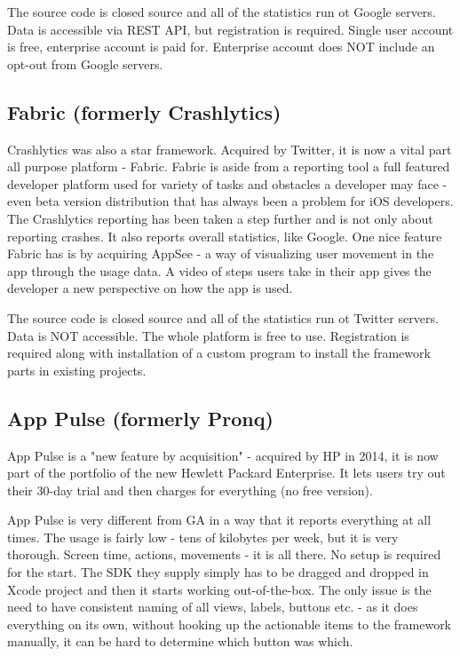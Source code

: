 The source code is closed source and all of the statistics run ot Google servers. Data is accessible via REST API, but registration is required. Single user account is free, enterprise account is paid for. Enterprise account does NOT include an opt-out from Google servers.


\subsection{Fabric (formerly Crashlytics)}

Crashlytics was also a star framework. Acquired by Twitter, it is now a vital part all purpose platform - Fabric. Fabric is aside from a reporting tool a full featured developer platform used for variety of tasks and obstacles a developer may face - even beta version distribution that has always been a problem for iOS developers. The Crashlytics reporting has been taken a step further and is not only about reporting crashes. It also reports overall statistics, like Google. One nice feature Fabric has is by acquiring AppSee - a way of visualizing user movement in the app through the usage data. A video of steps users take in their app gives the developer a new perspective on how the app is used.

The source code is closed source and all of the statistics run ot Twitter servers. Data is NOT accessible. The whole platform is free to use. Registration is required along with installation of a custom program to install the framework parts in existing projects.


\subsection{App Pulse (formerly Pronq)}

App Pulse is a "new feature by acquisition" - acquired by HP in 2014, it is now part of the portfolio of the new Hewlett Packard Enterprise. It lets users try out their 30-day trial and then charges for everything (no free version).

App Pulse is very different from GA in a way that it reports everything at all times. The usage is fairly low - tens of kilobytes per week, but it is very thorough. Screen time, actions, movements - it is all there. No setup is required for the start. The SDK they supply simply has to be dragged and dropped in Xcode project and then it starts working out-of-the-box. The only issue is the need to have consistent naming of all views, labels, buttons etc. - as it does everything on its own, without hooking up the actionable items to the framework manually, it can be hard to determine which button was which.

